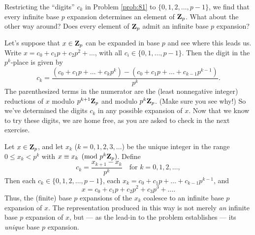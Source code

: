 \vspace{-0.22in}
\testrule
Restricting the ``digits'' $c_k$ in Problem \ref{prob:81} to $\{0,1,2,\dots,p-1\}$, we find that every infinite base $p$ expansion determines an element of $\mathbf{Z}_p$. What about the other way around? Does every element of $\mathbf{Z}_p$ admit an infinite base $p$ expansion? 

Let's suppose that $x\in \mathbf{Z}_p$ can be expanded in base $p$ and see where this leads us. Write $x = c_0 + c_1 p + c_2 p^2 + \dots$, with all $c_i \in \{0,1,\dots,p-1\}$. Then the digit in the $p^k$-place is given by
\[ c_k = \frac{(c_0 + c_1 p + \dots + c_k p^k) - (c_0 + c_1 p + \dots + c_{k-1}p^{k-1})}{p^k}.\]
The parenthesized terms in the numerator are the (least nonnegative integer) reductions of $x$ modulo $p^{k+1}\mathbf{Z}_p$ and modulo $p^k\mathbf{Z}_p$. (Make sure you see why!) So we've determined the digits $c_k$ in any possible expansion of $x$. Now that we know to try these digits, we are home free, as you are asked to check in the next exercise.
\testruletwo

\begin{prob}\label{prob:82} Let $x \in \mathbf{Z}_p$, and let $x_k$ ($k=0, 1,2,3,\dots$) be the unique integer in the range $0 \le x_k < p^k$ with $x\equiv x_k\pmod{p^k\mathbf{Z}_p}$. Define
\[ c_k = \frac{x_{k+1}-x_k}{p^k} \quad\text{for $k=0,1,2,\dots$}, \]
Then each $c_k \in \{0,1,2,\dots,p-1\}$, each $x_k = c_0 + c_1 p + \dots  + c_{k-1} p^{k-1}$, and 
\[ x = c_0 + c_1 p + c_2 p^2 + c_3 p^3 + \dots. \] 
{\scriptsize Thus, the (finite) base $p$ expansions of the $x_k$ coalesce to an infinite base $p$ expansion of $x$. The representation produced in this way is not merely \emph{an} infinite base $p$ expansion of $x$, but --- as the lead-in to the problem establishes --- its \emph{unique} base $p$ expansion.}
\end{prob}




